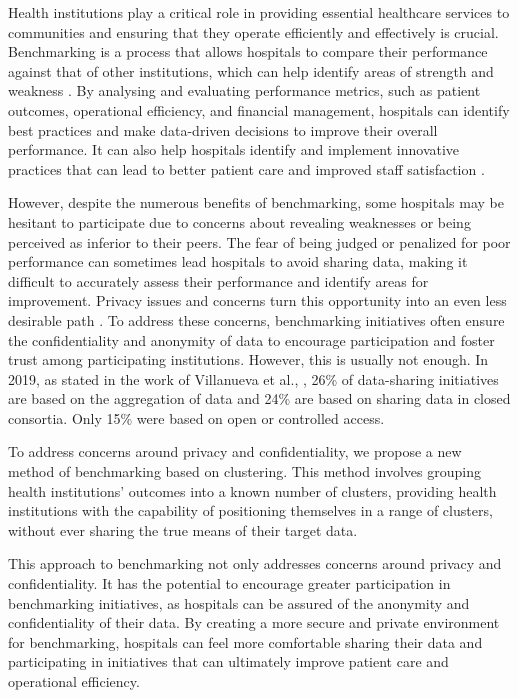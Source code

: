 Health institutions play a critical role in providing essential healthcare services to communities and ensuring that they operate efficiently and effectively is crucial. Benchmarking is a process that allows hospitals to compare their performance against that of other institutions, which can help identify areas of strength and weakness \cite{suydamPatientSafetyData2007}. By analysing and evaluating performance metrics, such as patient outcomes, operational efficiency, and financial management, hospitals can identify best practices and make data-driven decisions to improve their overall performance. It can also help hospitals identify and implement innovative practices that can lead to better patient care and improved staff satisfaction \cite{hulsenSharingCaringData2020}.

However, despite the numerous benefits of benchmarking, some hospitals may be hesitant to participate due to concerns about revealing weaknesses or being perceived as inferior to their peers. The fear of being judged or penalized for poor performance can sometimes lead hospitals to avoid sharing data, making it difficult to accurately assess their performance and identify areas for improvement. Privacy issues and concerns turn this opportunity into an even less desirable path \cite{hulsenSharingCaringData2020}. To address these concerns, benchmarking initiatives often ensure the confidentiality and anonymity of data to encourage participation and foster trust among participating institutions. However, this is usually not enough. In 2019, as stated in the work of Villanueva et al., \cite{villanuevaCharacterizingBiomedicalDataSharing2019}, 26\% of data-sharing initiatives are based on the aggregation of data and 24\% are based on sharing data in closed consortia. Only 15\% were based on open or controlled access.

To address concerns around privacy and confidentiality, we propose a new method of benchmarking based on clustering. This method involves grouping health institutions' outcomes into a known number of clusters, providing health institutions with the capability of positioning themselves in a range of clusters, without ever sharing the true means of their target data.

This approach to benchmarking not only addresses concerns around privacy and confidentiality. It has the potential to encourage greater participation in benchmarking initiatives, as hospitals can be assured of the anonymity and confidentiality of their data. By creating a more secure and private environment for benchmarking, hospitals can feel more comfortable sharing their data and participating in initiatives that can ultimately improve patient care and operational efficiency.

